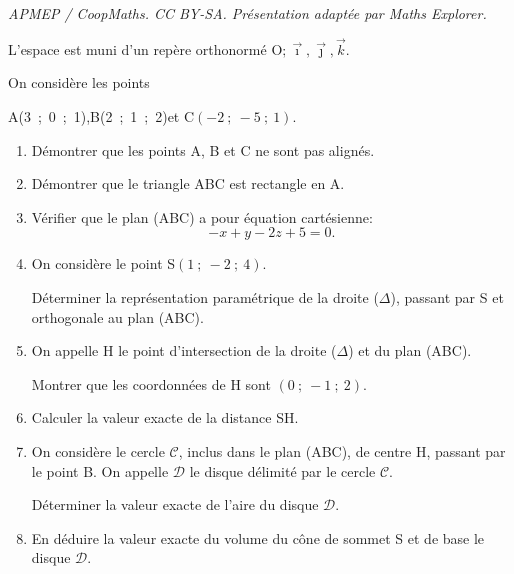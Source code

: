 \documentclass[10pt]{article}
\providecommand{\Oijk}{\(\mathrm{O};\vec{\imath},\vec{\jmath},\vec{k}\)}
\begin{document}
\noindent\textit{APMEP / CoopMaths. CC BY-SA. Présentation adaptée par Maths Explorer.}\par\medskip
\medskip

L'espace est muni d'un repère orthonormé \Oijk.

On considère les points 
\begin{center}A(3~;~0~;~1),\qquad  B(2~;~1~;~2)\quad  et \quad C$(- 2~;~- 5~;~1)$.\end{center}

\smallskip

\begin{enumerate}
\item Démontrer que les points A, B et C ne sont pas alignés.
\item Démontrer que le triangle ABC est rectangle en A.
\item Vérifier que le plan (ABC) a pour équation cartésienne:
\[-x + y - 2z + 5 = 0.\]

\item On considère le point S$(1~;~-2~;~4)$.

Déterminer la représentation paramétrique de la droite ($\Delta$), passant par S et
orthogonale au plan (ABC).
\item On appelle H le point d'intersection de la droite ($\Delta$) et du plan (ABC).

Montrer que les coordonnées de H sont $(0~;~-1~;~2)$.
\item Calculer la valeur exacte de la distance SH.
\item On considère le cercle $\mathcal{C}$, inclus dans le plan (ABC), de centre H, passant par le
point B. On appelle $\mathcal{D}$ le disque délimité par le cercle $\mathcal{C}$.

Déterminer la valeur exacte de l'aire du disque $\mathcal{D}$.
\item En déduire la valeur exacte du volume du cône de sommet S et de base le
disque $\mathcal{D}$.
\end{enumerate}

\medskip
\end{document}
